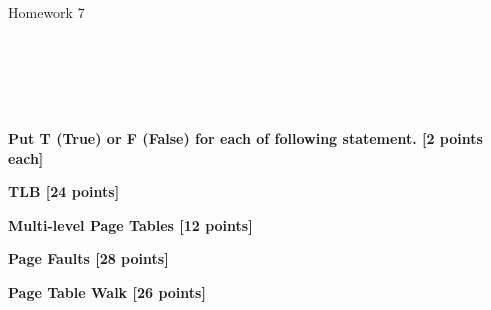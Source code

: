 \documentclass[addpoints, 12pt, answers]{exam}
\begin{document}
    \begin{center}

    {\centering \Large Homework 7\\\vspace{.75cm}}

        \vspace{0.1cm}
        \\[0.6cm]
        \\[0.6cm]
        \\[0.6cm]
        \\[0.5cm]

    \end{center}
    
    \begin{questions}
        \question[10] \textbf{Put T (True) or F (False) for each of following statement. [2 points each]}
        
        \newpage
        \question[24] \textbf{TLB [24 points]}
        
        \clearpage
        \question[12] \textbf{Multi-level Page Tables [12 points]}
        
        \newpage
         \question[28] \textbf{Page Faults [28 points]}
        
        \newpage
        \question[26] \textbf{Page Table Walk [26 points]}
        
       \newpage

    \end{questions}
\end{document}
